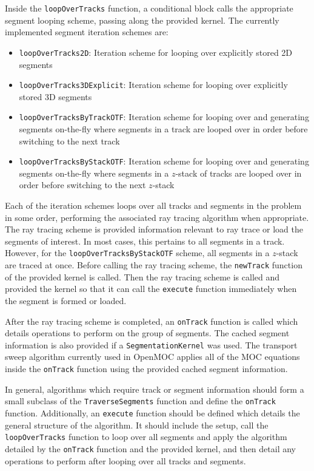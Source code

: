 Inside the \texttt{loopOverTracks} function, a conditional block calls the appropriate segment looping scheme, passing along the provided kernel. The currently implemented segment iteration schemes are:
\begin{itemize}
	\item \texttt{loopOverTracks2D}: Iteration scheme for looping over explicitly stored 2D segments
	\item \texttt{loopOverTracks3DExplicit}: Iteration scheme for looping over explicitly stored 3D segments
	\item \texttt{loopOverTracksByTrackOTF}: Iteration scheme for looping over and generating segments on-the-fly where segments in a track are looped over in order before switching to the next track
	\item \texttt{loopOverTracksByStackOTF}: Iteration scheme for looping over and generating segments on-the-fly where segments in a $z$-stack of tracks are looped over in order before switching to the next $z$-stack
\end{itemize}
Each of the iteration schemes loops over all tracks and segments in the problem in some order, performing the associated ray tracing algorithm when appropriate. The ray tracing scheme is provided information relevant to ray trace or load the segments of interest. In most cases, this pertains to all segments in a track. However, for the \texttt{loopOverTracksByStackOTF} scheme, all segments in a $z$-stack are traced at once. Before calling the ray tracing scheme, the \texttt{newTrack} function of the provided kernel is called. Then the ray tracing scheme is called and provided the kernel so that it can call the \texttt{execute} function immediately when the segment is formed or loaded. 

After the ray tracing scheme is completed, an \texttt{onTrack} function is called which details operations to perform on the group of segments. The cached segment information is also provided if a \texttt{SegmentationKernel} was used. The transport sweep algorithm currently used in OpenMOC applies all of the MOC equations inside the \texttt{onTrack} function using the provided cached segment information.

In general, algorithms which require track or segment information should form a small subclass of the \texttt{TraverseSegments} function and define the \texttt{onTrack} function. Additionally, an \texttt{execute} function should be defined which details the general structure of the algorithm. It should include the setup, call the \texttt{loopOverTracks} function to loop over all segments and apply the algorithm detailed by the \texttt{onTrack} function and the provided kernel, and then detail any operations to perform after looping over all tracks and segments. 

